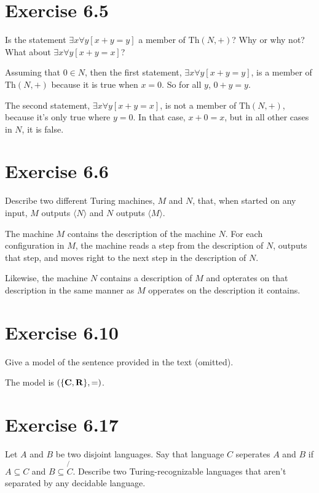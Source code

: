 \documentclass{article}
\begin{document}
\section{Exercise 6.5}

Is the statement $\exists x \forall y [ x + y = y]$ a member of $\text{Th}(N,
+)$? Why or why not? What about $\exists x \forall y [ x + y = x]$?

Assuming that $0 \in N$, then the first statement, $\exists x \forall y [ x + y
= y]$, is a member of $\text{Th}(N, +)$ because it is true when $x = 0$. So for
all $y$, $0 + y = y$.

The second statement, $\exists x \forall y [ x + y = x]$, is not a member of $\text{Th}(N,
+)$, because it's only true where $y = 0$. In that case, $x + 0 = x$, but in all
other cases in $N$, it is false. 

\section{Exercise 6.6}

Describe two different Turing machines, $M$ and $N$, that, when started on any
input, $M$ outputs $\langle N \rangle$ and $N$ outputs $\langle M \rangle$.

The machine $M$ contains the description of the machine $N$. For each
configuration in $M$, the machine reads a step from the description of $N$,
outputs that step, and moves right to the next step in the description of $N$. 

Likewise, the machine $N$ contains a description of $M$ and opterates on that
description in the same manner as $M$ opperates on the description it contains.

\section{Exercise 6.10}

Give a model of the sentence provided in the text (omitted).

The model is $(\{ \bf{C}, \bf{R} \}, =)$.

\section{Exercise 6.17}

Let $A$ and $B$ be two disjoint languages. Say that language $C$ seperates $A$
and $B$ if $A \subseteq C$ and $B \subseteq \not{C}$. Describe two
Turing-recognizable languages that aren't separated by any decidable language.
\end{document}
